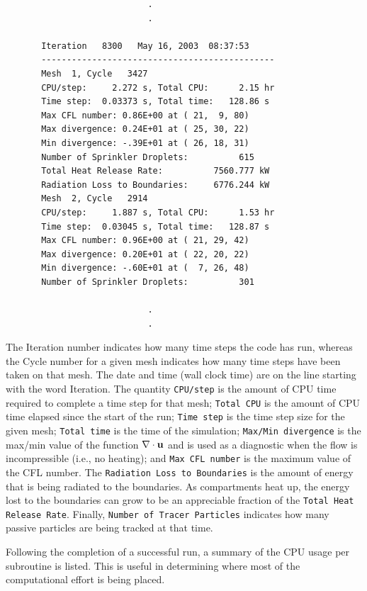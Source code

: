 \documentclass[11pt]{book}
\newcommand{\ct}{\tt\small}
\newcommand{\bu}{{\bf u}}
\begin{document}
\footnotesize
\begin{verbatim}
                            .
                            .

       Iteration   8300   May 16, 2003  08:37:53
       ----------------------------------------------
       Mesh  1, Cycle   3427
       CPU/step:     2.272 s, Total CPU:      2.15 hr
       Time step:  0.03373 s, Total time:   128.86 s
       Max CFL number: 0.86E+00 at ( 21,  9, 80)
       Max divergence: 0.24E+01 at ( 25, 30, 22)
       Min divergence: -.39E+01 at ( 26, 18, 31)
       Number of Sprinkler Droplets:          615
       Total Heat Release Rate:          7560.777 kW
       Radiation Loss to Boundaries:     6776.244 kW
       Mesh  2, Cycle   2914
       CPU/step:     1.887 s, Total CPU:      1.53 hr
       Time step:  0.03045 s, Total time:   128.87 s
       Max CFL number: 0.96E+00 at ( 21, 29, 42)
       Max divergence: 0.20E+01 at ( 22, 20, 22)
       Min divergence: -.60E+01 at (  7, 26, 48)
       Number of Sprinkler Droplets:          301

                            .
                            .
\end{verbatim}
\normalsize
The Iteration number indicates how many time steps the code has run, whereas the
Cycle number for a given mesh indicates how many time steps have been taken on that
mesh. The date and time (wall clock time) are on the line starting with the word
Iteration. The quantity {\ct CPU/step} is the amount of CPU time required to complete
a time step for that mesh; {\ct Total CPU} is the amount of CPU time elapsed since the
start of the run; {\ct Time step} is the time step size for the given mesh;
{\ct Total time} is the time of the simulation;
{\ct Max/Min divergence} is the max/min value of the
function $\nabla \cdot \bu$ and is used as a diagnostic when the flow
is incompressible (i.e., no heating); and {\ct Max CFL number} is the
maximum value of the CFL number. The {\ct Radiation Loss to Boundaries} is the
amount of energy that is being radiated to the boundaries. As compartments
heat up, the energy lost to the boundaries can grow to be an appreciable
fraction of the {\ct Total Heat Release Rate}. Finally, {\ct Number of Tracer Particles} indicates
how many passive particles are being tracked at that time.

Following the completion of a successful run, a summary of the CPU
usage per subroutine is listed. This is useful in determining where
most of the computational effort is being placed.
\end{document}
